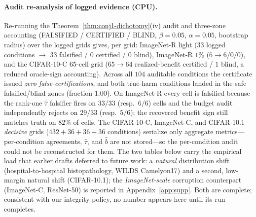 \documentclass[conference]{IEEEtran}
\theoremstyle{plain}
\theoremstyle{definition}
\begin{document}
\paragraph{Audit re-analysis of logged evidence (CPU).} Re-running the
Theorem~\ref{thm:conj1-dichotomy}(iv) audit and three-zone accounting (FALSIFIED /
CERTIFIED / BLIND, $\beta{=}0.05$, $\alpha{=}0.05$, bootstrap radius) over the logged
grids gives, per grid: ImageNet-R light ($33$ logged conditions $\to$ $33$ falsified /
$0$ certified / $0$ blind), ImageNet-R $1\%$ ($6\to 6/0/0$), and the CIFAR-10-C
$65$-cell grid ($65\to 64$ realized-benefit certified / $1$ blind, a reduced
oracle-sign accounting). Across all $104$ auditable conditions the certificate issued
\emph{zero false-certifications}, and both true-harm conditions landed in the safe
falsified/blind zones (fraction $1.00$). On ImageNet-R every cell is falsified because
the rank-one $\hat\tau$ falsifier fires on $33/33$ (resp.\ $6/6$) cells and the budget
audit independently rejects on $29/33$ (resp.\ $5/6$); the recovered benefit sign still
matches truth on $82\%$ of cells. The CIFAR-10-C, ImageNet-C, and CIFAR-10.1
\emph{decisive} grids ($432{+}36{+}36{+}36$ conditions) serialize only aggregate
metrics---per-condition agreements, $\hat\tau$, and $\hat b$ are not stored---so the
per-condition audit could not be reconstructed for them.
The two tables below carry the empirical load that earlier drafts deferred to future work:
a \emph{natural} distribution shift (hospital-to-hospital histopathology, WILDS Camelyon17) and
a second, low-margin natural shift (CIFAR-10.1); the \emph{ImageNet-scale} corruption counterpart
(ImageNet-C, ResNet-50) is reported in Appendix~\ref{app:supp}. Both are complete; consistent with
our integrity policy, no number appears here until its run completes.
\end{document}
